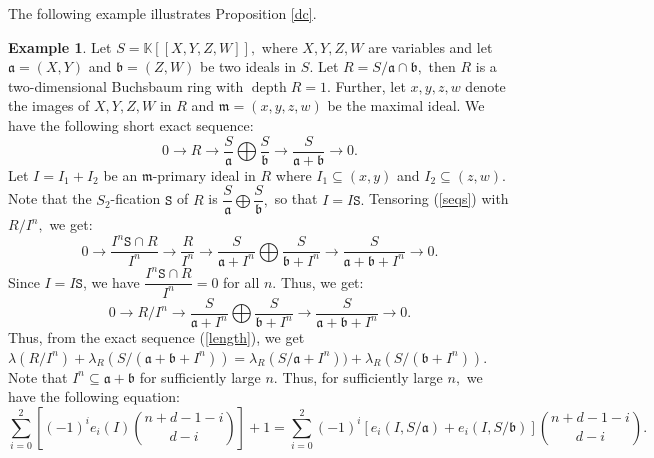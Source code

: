 \documentclass[reqno,a4paper,dvipsnames]{amsart}
\newcommand{\m}{\mathfrak{m} }
\newcommand{\depth}{\operatorname{depth}}
\theoremstyle{definition}
\newtheorem{example}[theorem]{Example}
\begin{document}
The following example illustrates Proposition \ref{dc}.



\begin{example} 
   Let $S=\mathbb K[[X,Y,Z,W]],$ where $X,Y,Z,W$ are variables and let $\mathfrak a =(X,Y)$ and $\mathfrak b= (Z,W)$ be two ideals in $S.$     Let $R=S/\mathfrak a \cap \mathfrak b,$ then $R$ is a two-dimensional Buchsbaum ring with $\depth R=1.$   Further, let $x,y,z,w$ denote the images of $X,Y,Z,W$ in $R$ and $\m=(x,y,z,w)$ be the maximal ideal. We have the following short exact sequence:
   \begin{equation} \label{seqs}
       0\longrightarrow R \longrightarrow \dfrac{S}{\mathfrak a}\bigoplus \dfrac{S}{\mathfrak b} \longrightarrow  \dfrac{S}{\mathfrak a +\mathfrak b}   \longrightarrow 0.
   \end{equation}
   Let $I=I_{1}+I_{2}$ be an $\m$-primary ideal in $R$ where $I_{1} \subseteq (x,y)$ and $I_{2} \subseteq (z,w).$ Note that the $S_{2}$-fication $\mathtt{S}$ of $R$ is $\dfrac{S}{\mathfrak a}\bigoplus \dfrac{S}{\mathfrak b},$ so that $I=I\mathtt{S}.$  Tensoring (\ref{seqs}) with $R/I^{n},$ we get:
    \begin{equation*}
         0 \longrightarrow \frac{I^{n}\mathtt{S} \cap R}{I^{n}} \longrightarrow \dfrac{R}{I^{n}}\longrightarrow \frac{S}{\mathfrak a + I^{n}}\bigoplus \frac{S}{\mathfrak b+ I^{n}}\longrightarrow \frac{S}{\mathfrak a+ \mathfrak b+ I^{n}}\longrightarrow 0.
     \end{equation*}
     Since $I=I \mathtt{S}$, we have $\dfrac{I^{n}\mathtt{S} \cap R}{I^{n}}=0$ for all $n.$ Thus, we get:
     \begin{equation} \label{length}
         0 \longrightarrow R/I^{n}\longrightarrow \frac{S}{\mathfrak a + I^{n}}\bigoplus \frac{S}{\mathfrak b+ I^{n}}\longrightarrow \frac{S}{\mathfrak a+ \mathfrak b+ I^{n}}\longrightarrow 0.
     \end{equation}
     Thus, from the exact sequence (\ref{length}), we get $\lambda(R/I^{n})+\lambda_{R}(S/(\mathfrak a+ \mathfrak b+ I^{n}))=\lambda_{R}(S/\mathfrak a + I^{n}))+\lambda_{R}(S/( \mathfrak b+ I^{n})).$
     Note that $I^{n} \subseteq \mathfrak a+\mathfrak b$ for sufficiently large $n$.  Thus, for sufficiently large $n,$ we have the following equation:
    \begin{equation} \label{november}
      \displaystyle \sum_{i=0}^{2}\left[(-1)^{i}e_{i}(I)\binom{n+d-1-i}{d-i}\right]+1=\displaystyle \sum_{i=0}^{2}(-1)^{i}\left[e_{i}(I,S/\mathfrak a) +e_{i}(I,S/\mathfrak b)\right]\binom{n+d-1-i}{d-i}.

\end{equation}
\end{example}
\end{document}
